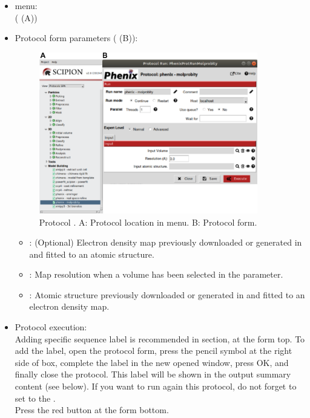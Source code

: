 \begin{itemize}
 \item \scipion menu:\\
   ( (A))\\
  
 \item Protocol form parameters ( (B)):\\
  
    \begin{figure}[H]
     \centering 
     \captionsetup{width=.7\linewidth} 
     \includegraphics[width=0.90\textwidth]{Images_appendix/Fig143.pdf}
     \caption{Protocol . A: Protocol location in \scipion menu. B: Protocol form.}
     \label{fig:app_protocol_molprobity_1}
    \end{figure}

    \begin{itemize}
     \item {}: (Optional) Electron density map previously downloaded or generated in \scipion and fitted to an atomic structure.
     \item {}: Map resolution when a volume has been selected in the  parameter.
     \item {}: Atomic structure previously downloaded or generated in \scipion and fitted to an electron density map.\
    \end{itemize}
    
 \item Protocol execution:\\
 Adding specific sequence label is recommended in  section, at the form top. To add the label, open the protocol form, press the pencil symbol at the right side of  box, complete the label in the new opened window, press OK, and finally close the protocol. This label will be shown in the output summary content (see below). If you want to run again this protocol, do not forget to set to  the .\\
  Press the \ttt{Execute} red button at the form bottom.\\
  

\end{itemize}
